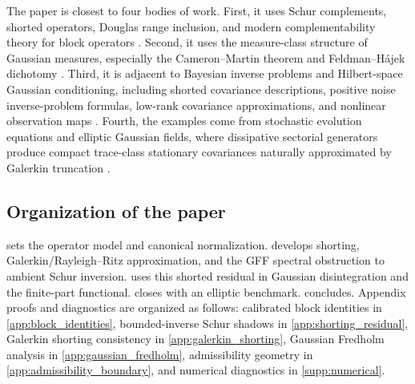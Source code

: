 \documentclass[preprint,12pt]{elsarticle}
\theoremstyle{plain}
\theoremstyle{definition}
\theoremstyle{remark}
\begin{document}
    The paper is closest to four bodies of work.  First, it uses Schur
    complements, shorted operators, Douglas range inclusion, and modern
    complementability theory for block operators
    \cite{krein1947selfadjoint,anderson1975shorted,douglas1966majorization,tretter2008spectral,contino2018schur,friedrich2017generalized,contino2021matrix,naikjohnson2024complementable}.
    Second, it uses the measure-class structure of Gaussian measures,
    especially the Ca\-me\-ron--Mar\-tin theorem and Feld\-man--H\'{a}\-jek dichotomy
    \cite{feldman1958equivalence,hajek1958property,bogachev1998gaussian}.
    Third, it is adjacent to Bayesian inverse problems and Hilbert-space
    Gaussian conditioning, including shorted covariance descriptions, positive
    noise inverse-problem formulas, low-rank covariance approximations, and nonlinear
    observation maps
    \cite{owhadi2015conditioning,stuart2010inverse,steinwart2024conditioning,chen2024gaussian,carerelie2024covariance,carerelie2025mean,quang2022kl}.
    Fourth, the examples come from stochastic evolution equations and elliptic
    Gaussian fields, where dissipative sectorial generators produce compact
    trace-class stationary covariances naturally approximated by Galerkin
    truncation \cite{daprato2014stochastic,lord2014introduction,simon2005trace,henderson2022sobolev,jorgensentian2024hilbert}.

    \subsection{Organization of the paper}
    \label{sec:organization}

     sets the operator model and canonical normalization.
     develops shorting, Galerkin/Rayleigh--Ritz approximation,
    and the GFF spectral obstruction to ambient Schur inversion.
     uses this shorted residual in Gaussian
    disintegration and the finite-part functional.  closes with an
    elliptic benchmark.  concludes.    Appendix proofs and diagnostics are organized as follows:
    calibrated block identities in \ref{app:block_identities},
    bounded-inverse Schur shadows in \ref{app:shorting_residual},
    Galerkin shorting consistency in \ref{app:galerkin_shorting},
    Gaussian Fredholm analysis in \ref{app:gaussian_fredholm},
    admissibility geometry in \ref{app:admissibility_boundary},
    and numerical diagnostics in \ref{supp:numerical}.

\end{document}

